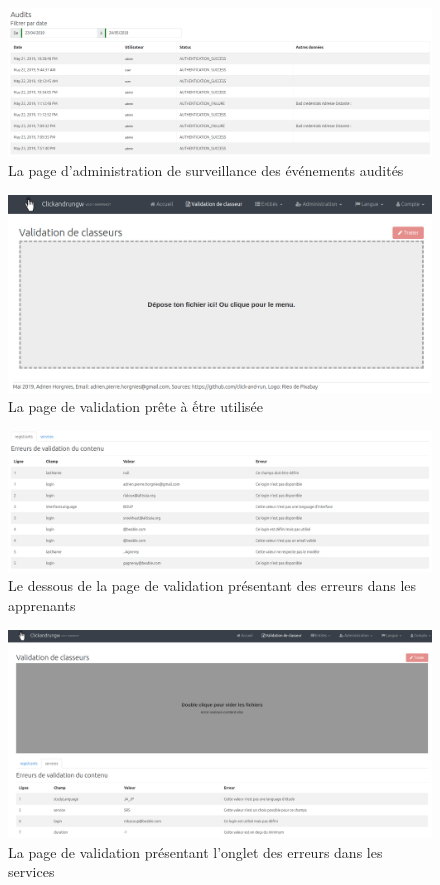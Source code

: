 \begin{figure}[ht]
    \centering
    \includegraphics[width=1\textwidth]{images/screenshot/admin-audits.png}
    \caption{La page d'administration de surveillance des événements audités}
\end{figure}

\begin{figure}[ht]
    \centering
    \includegraphics[width=1\textwidth]{images/screenshot/validation-empty.png}
    \caption{La page de validation prête à ếtre utilisée}
\end{figure}

\begin{figure}[ht]
    \centering
    \includegraphics[width=1\textwidth]{images/screenshot/validation-registrants.png}
    \caption{Le dessous de la page de validation présentant des erreurs dans les apprenants}
\end{figure}

\begin{figure}[ht]
    \centering
    \includegraphics[width=1\textwidth]{images/screenshot/validation-services.png}
    \caption{La page de validation présentant l'onglet des erreurs dans les services}
\end{figure}
